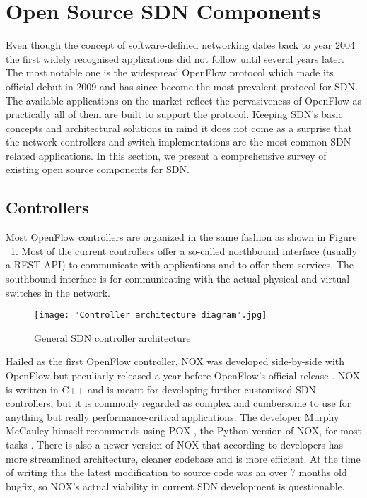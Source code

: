 \section{Open Source SDN Components}

Even though the concept of software-defined networking dates back to year 2004 \cite{robert2012system} the first widely recognised applications did not follow until several years later. The most notable one is the widespread OpenFlow protocol \cite{OpenFlow1.0.0} which made its official debut in 2009 and has since become the most prevalent protocol for SDN. The available applications on the market reflect the pervasiveness of OpenFlow as practically all of them are built to support the protocol. Keeping SDN’s basic concepts and architectural solutions in mind it does not come as a surprise that the network controllers and switch implementations are the most common SDN-related applications. In this section, we present a comprehensive survey of existing open source components for SDN.

\subsection{Controllers}

Most OpenFlow controllers are organized in the same fashion as shown in Figure ~\ref{fig:architecture}. Most of the current controllers offer a so-called northbound interface (usually a REST API) to communicate with applications and to offer them services. The southbound interface is for communicating with the actual physical and virtual switches in the network.

\begin{figure}[ht!]
\centering
{}
\texttt{[image: "Controller architecture diagram".jpg]}
\caption{General SDN controller architecture}
\label{fig:architecture}
\end{figure}

	Hailed as the first OpenFlow controller, NOX was developed side-by-side with OpenFlow but peculiarly released a year before OpenFlow’s official release \cite{NOX}. NOX is written in C++ and is meant for developing further customized SDN controllers, but it is commonly regarded as complex and cumbersome to use for anything but really performance-critical applications. The developer Murphy McCauley himself recommends using POX \cite{POX}, the Python version of NOX, for most tasks \cite{CHU12}. There is also a newer version of NOX that according to developers has more streamlined architecture, cleaner codebase and is more efficient. At the time of writing this the latest modification to source code was an over 7 months old bugfix, so NOX’s actual viability in current SDN development is questionable.

